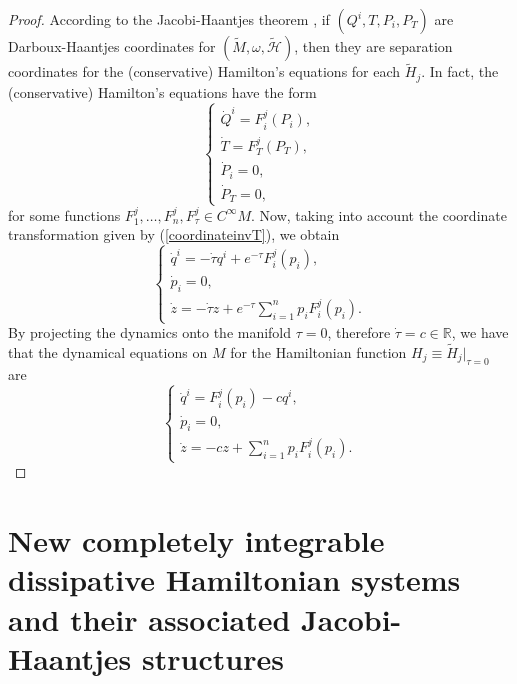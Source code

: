 \documentclass[10pt]{amsart}
\numberwithin{equation}{section}
\theoremstyle{definition}
\begin{document}
\begin{proof}
According to the Jacobi-Haantjes theorem \cite{RTT2022CNS}, if $(Q^{i},T,P_{i},P_{T})$ are Darboux-Haantjes coordinates for $(\tilde{M},\omega,\tilde{\mathscr{H}})$, then they are separation coordinates for the (conservative) Hamilton's equations for each $\tilde{H}_{j}$. In fact, the (conservative) Hamilton's equations have the form
\begin{equation}
\left\lbrace\begin{array}{c}
\dot{Q}^{i}=F^{j}_{i}(P_{i}),\\
\dot{T}=F^{j}_{T}(P_{T}),\\
\dot{P}_{i}=0,\\
\dot{P}_{T}=0,
\end{array}\right. 
\end{equation}
for some functions $F^{j}_{1},\ldots,F^{j}_{n},F^{j}_{\tau}\in C^{\infty}M$.
Now, taking into account the coordinate transformation given by (\ref{coordinateinvT}), we obtain
\begin{equation}
\left\lbrace\begin{array}{c}
\dot{q}^{i}=-\dot{\tau}q^{i}+e^{-\tau}F^{j}_{i}(p_{i}),\\
\dot{p}_{i}=0,\\
\dot{z}=-\dot{\tau}z+e^{-\tau}\displaystyle{\sum_{i=1}^{n}}p_{i}F^{j}_{i}(p_{i}).
\end{array}\right. 
\end{equation}
By projecting the dynamics onto the manifold $\tau=0$, therefore $\dot{\tau}=c\in\mathbb{R}$, we have that the dynamical equations on $M$ for the Hamiltonian function $H_{j}\equiv\tilde{H}_{j}\vert_{\tau=0}$ are
\begin{equation}
\left\lbrace\begin{array}{c}
\dot{q}^{i}=F^{j}_{i}(p_{i})-cq^{i},\\
\dot{p}_{i}=0,\\
\dot{z}=-cz+\displaystyle{\sum_{i=1}^{n}}p_{i}F^{j}_{i}(p_{i}).
\end{array}\right. 
\end{equation}
\end{proof}





\section{New completely integrable dissipative Hamiltonian systems and their associated Jacobi-Haantjes structures}
\label{sec7}
\end{document}
